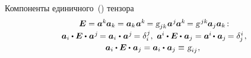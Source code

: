 \begin{otherlanguage}{russian}
Компоненты единичного~() тензора %
\vspace{0.1em}\begin{equation}\begin{array}{c}
\bm{E} = \bm{a}^{k} \hspace{-0.1ex} \bm{a}_{k} \hspace{-0.1ex} = \bm{a}_{k} \hspace{0.1ex} \bm{a}^{k} \hspace{-0.2ex} = \textsl{g}_{jk} \hspace{0.1ex} \bm{a}^{\hspace{0.1ex}j} \hspace{-0.1ex} \bm{a}^{k} \hspace{-0.2ex} = \textsl{g}^{\hspace{0.25ex}jk} \hspace{-0.1ex} \bm{a}_j \bm{a}_k \hspace{-0.32ex}: \\[0.2em]
%
\bm{a}_i \dotp \bm{E} \dotp \hspace{0.1ex} \bm{a}^{\hspace{0.1ex}j} \hspace{-0.2ex} = \bm{a}_i \hspace{0.1ex} \dotp \hspace{0.1ex} \bm{a}^{\hspace{0.1ex}j} \hspace{-0.2ex} = \delta_i^{\hspace{0.1ex}j} , \hspace{0.32em}
\bm{a}^{\hspace{-0.05ex}i} \dotp \bm{E} \dotp \hspace{0.1ex} \bm{a}_j = \bm{a}^{\hspace{-0.05ex}i} \hspace{-0.2ex} \dotp \hspace{0.1ex} \bm{a}_j \hspace{-0.2ex} = \delta_{\hspace{-0.1ex}j}^{\hspace{0.1ex}i} \hspace{0.2ex},
\\[0.2em]
%
\bm{a}_i \dotp \bm{E} \dotp \hspace{0.1ex} \bm{a}_j = \bm{a}_i \dotp \hspace{0.1ex} \bm{a}_j \equiv \hspace{0.16ex} \textsl{g}_{ij} \hspace{0.1ex} , \hspace{0.32em}

\end{array}
\end{equation}
\end{otherlanguage}
